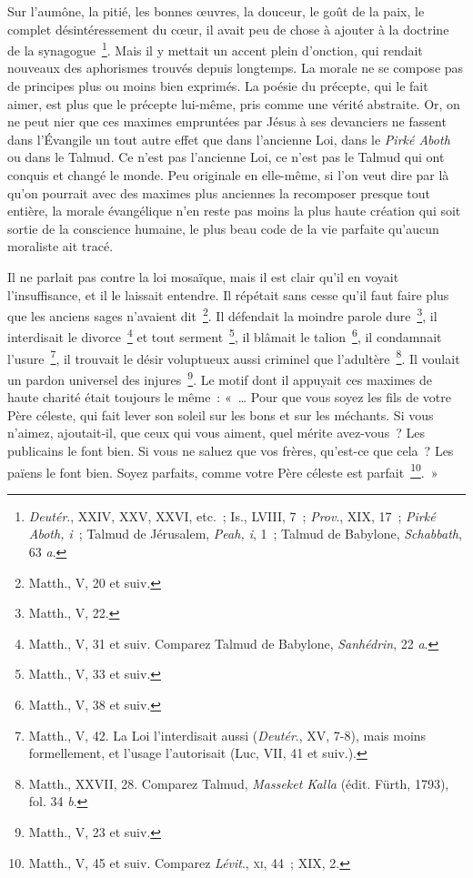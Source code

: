 \documentclass[french,twoside]{book} %
\begin{document}
\noindent Sur l’aumône, la pitié, les bonnes œuvres, la douceur, le goût de la paix, le complet désintéressement du cœur, il avait peu de chose à ajouter à la doctrine de la synagogue \footnote{{\itshape Deutér}., XXIV, XXV, XXVI, etc. ; Is., LVIII, 7 ; {\itshape Prov}., XIX, 17 ; {\itshape Pirké Aboth, i} ; Talmud de Jérusalem, {\itshape Peah, i}, 1 ; Talmud de Babylone, {\itshape Schabbath}, 63 {\itshape a}.}. Mais il y mettait un accent plein d’onction, qui rendait nouveaux des aphorismes trouvés depuis longtemps. La morale ne se compose pas de principes plus ou moins bien exprimés. La poésie du précepte, qui le fait aimer, est plus que le précepte lui-même, pris comme une vérité abstraite. Or, on ne peut nier que ces maximes empruntées par Jésus à ses devanciers ne fassent dans l’Évangile un tout autre effet que dans l’ancienne Loi, dans le {\itshape Pirké Aboth} ou dans le Talmud. Ce n’est pas l’ancienne Loi, ce n’est pas le Talmud qui ont conquis et changé le monde. Peu originale en elle-même, si l’on veut dire par là qu’on pourrait avec des maximes plus anciennes la recomposer presque tout entière, la morale évangélique n’en reste pas moins la plus haute création qui soit sortie de la conscience humaine, le plus beau code de la vie parfaite qu’aucun moraliste ait tracé.\par
Il ne parlait pas contre la loi mosaïque, mais il est clair qu’il en voyait l’insuffisance, et il le laissait entendre. Il répétait sans cesse qu’il faut faire plus que les anciens sages n’avaient dit \footnote{Matth., V, 20 et suiv.}. Il défendait la moindre parole dure \footnote{Matth., V, 22.}, il interdisait le divorce \footnote{ Matth., V, 31 et suiv. Comparez Talmud de Babylone, {\itshape Sanhédrin}, 22 {\itshape a}.} et tout serment \footnote{Matth., V, 33 et suiv.}, il blâmait le talion \footnote{Matth., V, 38 et suiv.}, il condamnait l’usure \footnote{ Matth., V, 42. La Loi l’interdisait aussi ({\itshape Deutér}., XV, 7-8), mais moins formellement, et l’usage l’autorisait (Luc, VII, 41 et suiv.).}, il trouvait le désir voluptueux aussi criminel que l’adultère \footnote{ Matth., XXVII, 28. Comparez Talmud, {\itshape Masseket Kalla} (édit. Fürth, 1793), fol. 34 {\itshape b}.}. Il voulait un pardon universel des injures \footnote{Matth., V, 23 et suiv.}. Le motif dont il appuyait ces maximes de haute charité était toujours le même : « … Pour que vous soyez les fils de votre Père céleste, qui fait lever son soleil sur les bons et sur les méchants. Si vous n’aimez, ajoutait-il, que ceux qui vous aiment, quel mérite avez-vous ? Les publicains le font bien. Si vous ne saluez que vos frères, qu’est-ce que cela ? Les païens le font bien. Soyez parfaits, comme votre Père céleste est parfait \footnote{ Matth., V, 45 et suiv. Comparez {\itshape Lévit}., \textsc{xi}, 44 ; XIX, 2.}. »\par
\end{document}

